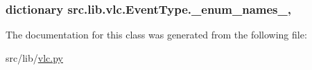 \subsubsection[{\+\_\+enum\+\_\+names\+\_\+}]{\setlength{\rightskip}{0pt plus 5cm}dictionary src.\+lib.\+vlc.\+Event\+Type.\+\_\+enum\+\_\+names\+\_\+\hspace{0.3cm}{\ttfamily [static]}, {\ttfamily [private]}}\label{classsrc_1_1lib_1_1vlc_1_1EventType_a91ba07bdc81b31c96003ce137c162764}


The documentation for this class was generated from the following file\+:\begin{DoxyCompactItemize}
\item 
src/lib/\hyperlink{vlc_8py}{vlc.\+py}\end{DoxyCompactItemize}
